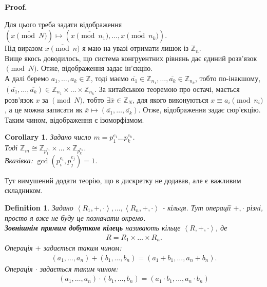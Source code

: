 \documentclass[a4paper, 10pt]{article}
\makeatletter
\theoremstyle{theoremdd}
\theoremstyle{theoremdd}
\newtheorem{definition}[theorem]{Definition}
\theoremstyle{theoremdd}
\theoremstyle{theoremdd}
\theoremstyle{theoremdd}
\theoremstyle{theoremdd}
\theoremstyle{theoremdd}
\theoremstyle{theoremdd}
\newtheorem{corollary}[theorem]{Corollary}
\renewenvironment{proof}[1][Proof.\\]{\par
\pushQED{\hfill \qed}%
\normalfont \topsep6\p@\@plus6\p@\relax
\trivlist
\item\relax
{\bfseries
#1\@addpunct{.}}\hspace\labelsep\ignorespaces
}{%
\popQED\endtrivlist\@endpefalse
}
\makeatother
\begin{document}
\begin{proof}
Для цього треба задати відображення \\
$(\overline{x \pmod N}) \mapsto (\overline{x \pmod {n_1}}, \dots, \overline{x \pmod {n_k}})$.\\
Під виразом $\overline{x \pmod n}$ я маю на увазі отримати лишок із $\mathbb{Z}_n$.\\
Вище якось доводилось, що система конгруентних рівнянь дає єдиний розв'язок $\pmod N$. Отже, відображення задає ін'єкцію.\\
А далі беремо $a_1,\dots,a_k \in \mathbb{Z}$, тоді маємо $\overline{a_1} \in \mathbb{Z}_{n_1}, \dots, \overline{a_k} \in \mathbb{Z}_{n_k}$, тобто по-інакшому, $(\overline{a_1},\dots, \overline{a_k}) \in \mathbb{Z}_{n_1} \times \dots \times \mathbb{Z}_{n_k}$. За китайською теоремою про остачі, мається розв'язок $x$ за $\pmod N$, тобто $\exists \overline{x} \in \mathbb{Z}_N$, для якого виконуються $x \equiv a_i \pmod {n_i}$, а це можна записати як $\overline{x} \mapsto (\overline{a_1},\dots,\overline{a_k})$. Отже, відображення задає сюр'єкцію.\\
Таким чином, відображення є ізоморфізмом.
\end{proof}

\begin{corollary}
Задано число $m = p_1^{e_1} \dots p_k^{e_k}$.\\
Тоді $\mathbb{Z}_m \cong \mathbb{Z}_{p_1^{e_1}} \times \dots \times \mathbb{Z}_{p_k^{e_k}}$.\\
\textit{Вказівка: $\gcd(p_i^{e_i},p_j^{e_j}) = 1$.}
\end{corollary}

Тут вимушений додати теорію, що в дискретку не додавав, але є важливим складником.

\begin{definition}
Задано $\left< R_1,+,\cdot \right>, \dots, \left< R_n, +, \cdot \right>$ - кільця. Тут операції $+,\cdot$ різні, просто я вже не буду це позначати окремо.\\
\textbf{Зовнішнім прямим добутком кілець} називають кільце $\left< R,+,\cdot \right>$, де
\begin{align*}
R = R_1 \times \dots \times R_n.
\end{align*}
Операція $+$ задається таким чином:
\begin{align*}
(a_1,\dots,a_n) + (b_1,\dots,b_n) = (a_1+b_1,\dots,a_n+b_n).
\end{align*}
Операція $\cdot$ задається таким чином:
\begin{align*}
(a_1,\dots,a_n) \cdot (b_1,\dots,b_n) = (a_1 \cdot b_1, \dots, a_n \cdot b_n)
\end{align*}
\end{definition}
\end{document}

